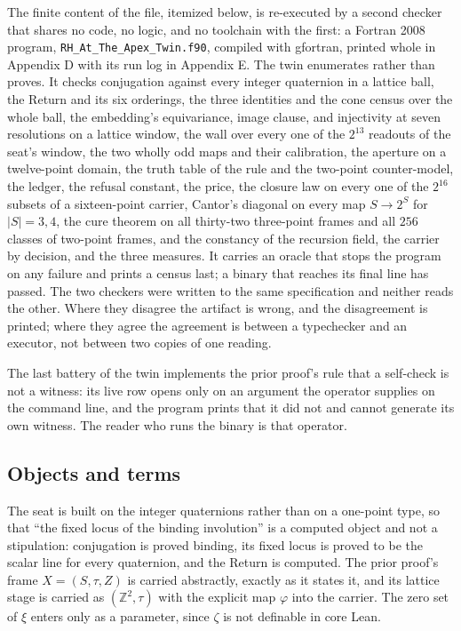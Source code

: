 \documentclass[10pt]{article}
\begin{document}
The finite content of the file, itemized below, is re-executed by a
second checker that shares no code, no logic, and no toolchain with the
first: a Fortran 2008 program, \texttt{RH\_At\_The\_Apex\_Twin.f90},
compiled with gfortran, printed whole in Appendix D with its run log in
Appendix E. The twin enumerates rather than proves. It checks
conjugation against every integer quaternion in a lattice ball, the
Return and its six orderings, the three identities and the cone census
over the whole ball, the embedding's equivariance, image clause, and
injectivity at seven resolutions on a lattice window, the wall over
every one of the \(2^{13}\) readouts of the seat's window, the two
wholly odd maps and their calibration, the aperture on a twelve-point
domain, the truth table of the rule and the two-point counter-model, the
ledger, the refusal constant, the price, the closure law on every one of
the \(2^{16}\) subsets of a sixteen-point carrier, Cantor's diagonal on
every map \(S \to 2^S\) for \(|S| = 3, 4\), the cure theorem on all
thirty-two three-point frames and all \(256\) classes of two-point
frames, and the constancy of the recursion field, the carrier by
decision, and the three measures. It carries an oracle that stops the
program on any failure and prints a census last; a binary that reaches
its final line has passed. The two checkers were written to the same
specification and neither reads the other. Where they disagree the
artifact is wrong, and the disagreement is printed; where they agree the
agreement is between a typechecker and an executor, not between two
copies of one reading.

The last battery of the twin implements the prior proof's rule that a
self-check is not a witness: its live row opens only on an argument the
operator supplies on the command line, and the program prints that it
did not and cannot generate its own witness. The reader who runs the
binary is that operator.

\hypertarget{objects-and-terms}{%
\subsection{Objects and terms}\label{objects-and-terms}}

The seat is built on the integer quaternions rather than on a one-point
type, so that ``the fixed locus of the binding involution'' is a
computed object and not a stipulation: conjugation is proved binding,
its fixed locus is proved to be the scalar line for every quaternion,
and the Return is computed. The prior proof's frame \(X = (S, \tau, Z)\)
is carried abstractly, exactly as it states it, and its lattice stage is
carried as \((\mathbb{Z}^2, \tau)\) with the explicit map \(\varphi\)
into the carrier. The zero set of \(\xi\) enters only as a parameter,
since \(\zeta\) is not definable in core Lean.
\end{document}
